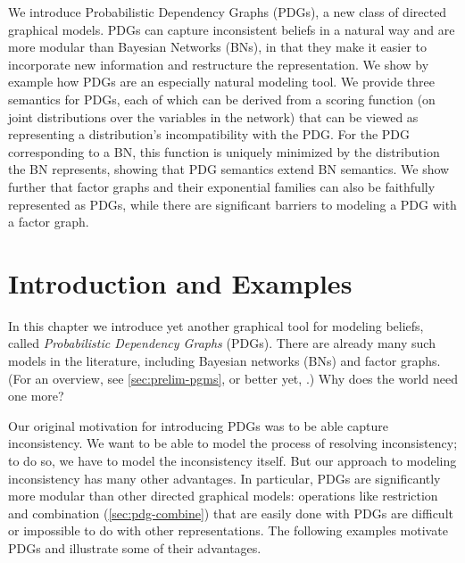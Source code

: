 \label{chap:pdg-repr}

We introduce Probabilistic Dependency Graphs (PDGs), a new class of
directed graphical models. PDGs can capture inconsistent beliefs in a
natural way and are more modular than Bayesian Networks (BNs), in that
they make it easier to incorporate new information and restructure the  
representation. We show by example how PDGs are an especially natural
modeling tool.
We provide three semantics for PDGs, each of which can be derived from a
scoring function (on joint distributions over the
variables in the network) that can be viewed as representing a
distribution's incompatibility with the PDG.
For the PDG corresponding
to a BN, this function is uniquely minimized by the distribution the
BN represents, showing that PDG semantics extend BN semantics.  
We show further that factor graphs
and their exponential families
can also be faithfully represented as PDGs,
while there are significant barriers to modeling a PDG with a factor graph.

\section{Introduction and Examples}

In this chapter we introduce yet another graphical tool 
    for modeling beliefs, called \emph{Probabilistic Dependency Graphs} (PDGs). 
There are already many such models in the literature, including Bayesian networks (BNs) and factor graphs. 
(For an overview, see \cref{sec:prelim-pgms}, or better yet, \citet{KF09}.)
Why does the world need one more?  

Our original motivation for introducing PDGs was to be able capture
inconsistency. We want to be able to model the process of resolving
inconsistency; to do so, we have to model the inconsistency itself. But our
approach to modeling inconsistency has many other advantages. 
In particular, PDGs are significantly more modular than other directed graphical models: operations like restriction and 
combination (\cref{sec:pdg-combine}) that are easily done with PDGs are difficult or impossible to do with other representations.
The following examples motivate PDGs and illustrate some of
their advantages.

